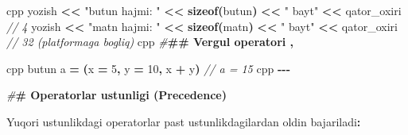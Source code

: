\documentclass[a4paper,11pt,twoside,openright]{book}
\newenvironment{Shaded}{\begin{snugshade}}{\end{snugshade}}
\newcommand{\CommentTok}[1]{\textcolor[rgb]{0.56,0.35,0.01}{\textit{#1}}}
\newcommand{\DecValTok}[1]{\textcolor[rgb]{0.00,0.00,0.81}{#1}}
\newcommand{\ErrorTok}[1]{\textcolor[rgb]{0.64,0.00,0.00}{\textbf{#1}}}
\newcommand{\KeywordTok}[1]{\textcolor[rgb]{0.13,0.29,0.53}{\textbf{#1}}}
\newcommand{\NormalTok}[1]{#1}
\newcommand{\OperatorTok}[1]{\textcolor[rgb]{0.81,0.36,0.00}{\textbf{#1}}}
\newcommand{\PreprocessorTok}[1]{\textcolor[rgb]{0.56,0.35,0.01}{\textit{#1}}}
\newcommand{\StringTok}[1]{\textcolor[rgb]{0.31,0.60,0.02}{#1}}
\begin{document}
\begin{Shaded}
\begin{Highlighting}[]
\ErrorTok{\textasciigrave{}\textasciigrave{}\textasciigrave{}}\NormalTok{cpp}
\NormalTok{yozish }\OperatorTok{\textless{}\textless{}} \StringTok{"butun hajmi: "} \OperatorTok{\textless{}\textless{}} \KeywordTok{sizeof}\OperatorTok{(}\NormalTok{butun}\OperatorTok{)} \OperatorTok{\textless{}\textless{}} \StringTok{" bayt"} \OperatorTok{\textless{}\textless{}}\NormalTok{ qator\_oxiri  }\CommentTok{// 4}
\NormalTok{yozish }\OperatorTok{\textless{}\textless{}} \StringTok{"matn hajmi: "} \OperatorTok{\textless{}\textless{}} \KeywordTok{sizeof}\OperatorTok{(}\NormalTok{matn}\OperatorTok{)} \OperatorTok{\textless{}\textless{}} \StringTok{" bayt"} \OperatorTok{\textless{}\textless{}}\NormalTok{ qator\_oxiri   }\CommentTok{// 32 (platformaga bog\textquotesingle{}liq)}
\ErrorTok{\textasciigrave{}\textasciigrave{}\textasciigrave{}}\NormalTok{cpp}
\PreprocessorTok{\#}\ErrorTok{\#\# Vergul operatori \textasciigrave{},\textasciigrave{}}

\ErrorTok{\textasciigrave{}\textasciigrave{}\textasciigrave{}}\NormalTok{cpp}
\NormalTok{butun a }\OperatorTok{=} \OperatorTok{(}\NormalTok{x }\OperatorTok{=} \DecValTok{5}\OperatorTok{,}\NormalTok{ y }\OperatorTok{=} \DecValTok{10}\OperatorTok{,}\NormalTok{ x }\OperatorTok{+}\NormalTok{ y}\OperatorTok{)}   \CommentTok{// a = 15}
\ErrorTok{\textasciigrave{}\textasciigrave{}\textasciigrave{}}\NormalTok{cpp}
\OperatorTok{{-}{-}{-}}

\PreprocessorTok{\#}\ErrorTok{\# Operatorlar ustunligi (Precedence)}

\NormalTok{Yuqori ustunlikdagi operatorlar past ustunlikdagilardan oldin bajariladi}\OperatorTok{:}


\end{Highlighting}
\end{Shaded}
\end{document}

